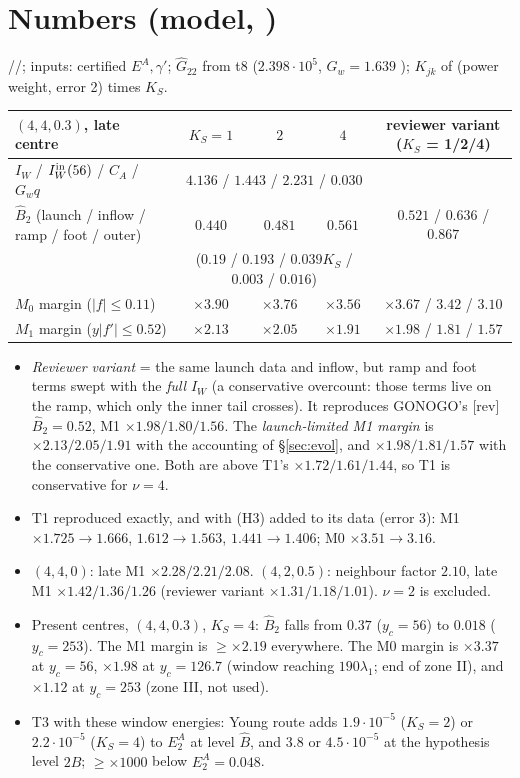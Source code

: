 \documentclass[11pt]{article}
\theoremstyle{remark}\newtheorem{remark}[theorem]{Remark}
\newcommand{\fn}[1]{\texttt{\detokenize{#1}}}
\begin{document}
\section{Numbers (model, \tE)}\label{sec:num}
\fn{launch_model.py}/\fn{.out}/\fn{.json}; inputs: certified $E^A,\gamma'$; $\hat G_{22}$ from t8 ($2.398\cdot10^5$, $G_w=1.639$ \tE); $K_{jk}$ of \fn{feas_P.json} (power weight, error 2) times $K_S$.
\begin{center}\small\begin{tabular}{@{}lcccc@{}}\toprule
$(4,4,0.3)$, late centre & $K_S=1$ & $2$ & $4$ & reviewer variant ($K_S$ = 1/2/4)\\\midrule
$I_W$ / $I_W^{\rm in}(56)$ / $C_A$ / $G_wq$ & \multicolumn{3}{c}{$4.136$ / $1.443$ / $2.231$ / $0.030$} & \\
$\hat B_2$ (launch / inflow / ramp / foot / outer) & $0.440$ & $0.481$ & $0.561$ & $0.521$ / $0.636$ / $0.867$\\
 & \multicolumn{3}{c}{($0.19$ / $0.193$ / $0.039K_S$ / $0.003$ / $0.016$)} & \\
$M_0$ margin ($|f|\le0.11$) & $\times3.90$ & $\times3.76$ & $\times3.56$ & $\times3.67$ / $3.42$ / $3.10$\\
$M_1$ margin ($y|f'|\le0.52$) & $\mathbf{\times2.13}$ & $\mathbf{\times2.05}$ & $\mathbf{\times1.91}$ & $\times1.98$ / $1.81$ / $1.57$\\\bottomrule
\end{tabular}\end{center}
\begin{itemize}[leftmargin=*,itemsep=2pt]
\item \emph{Reviewer variant} = the same launch data and inflow, but ramp and foot terms swept with the \emph{full} $I_W$ (a conservative overcount: those terms live on the ramp, which only the inner tail crosses). It reproduces GONOGO's [rev] $\hat B_2=0.52$, M1 $\times1.98/1.80/1.56$. The \emph{launch-limited M1 margin} is $\times2.13/2.05/1.91$ with the accounting of \S\ref{sec:evol}, and $\times1.98/1.81/1.57$ with the conservative one. Both are above T1's $\times1.72/1.61/1.44$, so T1 is conservative for $\nu=4$.
\item T1 reproduced exactly, and with (H3) added to its data (error 3): M1 $\times1.725\to1.666$, $1.612\to1.563$, $1.441\to1.406$; M0 $\times3.51\to3.16$.
\item $(4,4,0)$: late M1 $\times2.28/2.21/2.08$. $(4,2,0.5)$: neighbour factor $2.10$, late M1 $\times1.42/1.36/1.26$ (reviewer variant $\times1.31/1.18/1.01$). $\nu=2$ is excluded.
\item Present centres, $(4,4,0.3)$, $K_S=4$: $\hat B_2$ falls from $0.37$ ($y_c=56$) to $0.018$ ($y_c=253$). The M1 margin is $\ge\times2.19$ everywhere. The M0 margin is $\times3.37$ at $y_c=56$, $\times1.98$ at $y_c=126.7$ (window reaching $190\lambda_1$; end of zone II), and $\times1.12$ at $y_c=253$ (zone III, not used).
\item T3 with these window energies: Young route adds $1.9\cdot10^{-5}$ ($K_S=2$) or $2.2\cdot10^{-5}$ ($K_S=4$) to $E_2^A$ at level $\hat B$, and $3.8$ or $4.5\cdot10^{-5}$ at the hypothesis level $2\hat B$; $\ge\times1000$ below $E_2^A=0.048$.
\end{itemize}
\end{document}
